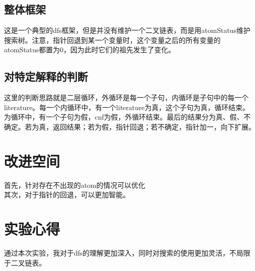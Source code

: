 \documentclass[UTF8]{article}
\begin{document}
\subsection{整体框架}

这是一个典型的dfs框架，但是并没有维护一个二叉链表，而是用atomStatus维护搜索树。注意，指针回退到某一个变量时，这个变量之后的所有变量的atomStatus都置为0，因为此时它们的祖先发生了变化。
\subsection{对特定解释的判断}

这里的判断思路就是二层循环，外循环是每一个子句，内循环是子句中的每一个literature。每一个内循环中，有一个literature为真，这个子句为真，循环结束。为循环中，有一个子句为假，cnf为假，外循环结束。最后的结果分为真、假、不确定。若为真，返回结果；若为假，指针回退；若不确定，指针加一，向下扩展。
\section{改进空间}
首先，针对存在不出现的atom的情况可以优化\\
其次，对于指针的回退，可以更加智能。
\section{实验心得}
通过本次实验，我对于dfs的理解更加深入，同时对搜索的使用更加灵活，不局限于二叉链表。
\end{document}
